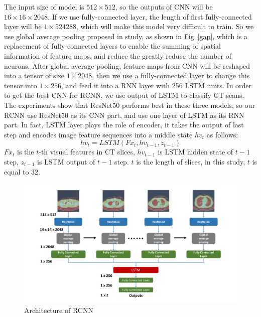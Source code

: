 \documentclass[runningheads]{llncs}
\begin{document}
The input size of model is $512 \times 512$, so the outputs of CNN will be $16 \times 16 \times 2048$. If we use fully-connected layer, the length of first fully-connected layer will be $1 \times 524288$, which will make this model very difficult to train. So we use global average pooling proposed in study\cite{lin2014network}, as shown in Fig~\ref{gap}, which is a replacement of fully-connected layers to enable the summing of spatial information of feature maps, and reduce the greatly reduce the number of neurons. 
After global average pooling, feature maps from CNN will be reshaped into a tensor of size $1 \times 2048$, then we use a fully-connected layer to change this tensor into $1 \times 256$, and feed it into a RNN layer with 256 LSTM units. In order to get the best CNN for RCNN, we use output of LSTM to classify CT scans. The experiments show that ResNet50 performs best in these three models, so our RCNN use ResNet50 as its CNN part, and use one layer of LSTM as its RNN part. In fact, LSTM layer plays the role of encoder, it takes the output of last step and encodes image feature sequences into a middle state $hv_t$ as follows:
\begin{equation}
hv_t = LSTM(Fx_t, hv_{t-1}, z_{t-1})
\label{hvt}
\end{equation}
$Fx_t$ is the $t$-th visual features in CT slices, $hv_{t-1}$ is LSTM hidden state of $t-1$ step, $z_{t-1}$ is LSTM output of $t-1$ step. $t$ is the length of slices, in this study, $t$ is equal to 32.

\begin{figure}[htb]
    \centerline{\includegraphics[width=130mm]{onestream.pdf}}
    \vspace{-0cm}
    \caption{Architecture of RCNN}
    \vspace{-0cm}
    \label{onestream}
    \end{figure}
\end{document}
